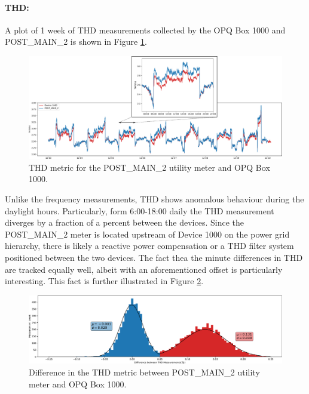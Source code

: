 \paragraph{THD:}
A plot of 1 week of THD measurements collected by the OPQ Box 1000 and POST\_MAIN\_2 is shown in Figure \ref{expdes:fig:postmain2:thd}.

\begin{figure}[ht!]
    \centering
    \includegraphics[width=1\linewidth]{img/napali_eval/gt/gt_thd.pdf}
    \caption{THD metric for the POST\_MAIN\_2 utility meter and OPQ Box 1000.}
    \label{expdes:fig:postmain2:thd}
\end{figure}

Unlike the frequency measurements, THD shows anomalous behaviour during the daylight hours.
Particularly, form 6:00-18:00 daily the THD measurement diverges by a fraction of a percent between the devices.
Since the POST\_MAIN\_2 meter is located upstream of Device 1000 on the power grid hierarchy, there is likely a reactive power compensation or a THD filter system positioned between the two devices.
The fact thea the minute differences in THD are tracked equally well, albeit with an aforementioned offset is particularly interesting.
This fact is further illustrated in Figure \ref{expdes:fig:postmain2:thd_diff}.

\begin{figure}[ht!]
    \centering
    \includegraphics[width=1\linewidth]{img/napali_eval/gt/gt_thd_diff.pdf}
    \caption{Difference in the THD metric between POST\_MAIN\_2 utility meter and OPQ Box 1000.}
    \label{expdes:fig:postmain2:thd_diff}
\end{figure}

